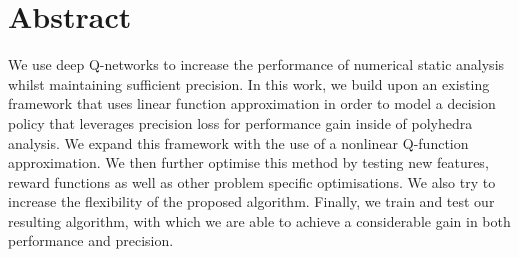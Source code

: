 
\chapter*{Abstract}
We use deep Q-networks to increase the performance of numerical static analysis whilst maintaining sufficient precision. In this work, we build upon an existing framework that uses linear function approximation in order to model a decision policy that leverages precision loss for performance gain inside of polyhedra analysis. We expand this framework with the use of a nonlinear Q-function approximation. We then further optimise this method by testing new features, reward functions as well as other problem specific optimisations. We also try to increase the flexibility of the proposed algorithm. Finally, we train and test our resulting algorithm, with which we are able to achieve a considerable gain in both performance and precision.

